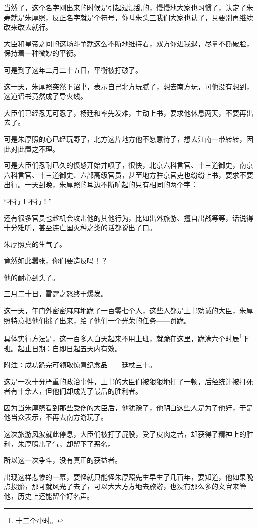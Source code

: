 \begin{multicols}{\theparacolNo}
		当然了，这个名字刚出来的时候是引起过混乱的，慢慢地大家也习惯了，认定了朱寿就是朱厚照，反正名字就是个符号，你叫朱头三我们大家也认了，只要别再继续改来改去就行。

		大臣和皇帝之间的这场斗争就这么不断地维持着，双方你进我退，尽量不撕破脸，保持着一种微妙的平衡。

		可是到了这年二月二十五日，平衡被打破了。

		这一天，朱厚照突然下诏书，表示自己北方玩腻了，想去南方玩，可他没有想到，这道诏书竟然成了导火线。

		大臣们已经忍无可忍了，杨廷和率先发难，主动上书，要求他休息两天，不要再出去了。

		可是朱厚照的心已经玩野了，北方这片地方他不愿意待了，想去江南一带转转，因此对此置之不理。

		可是大臣们忍耐已久的愤怒开始井喷了，很快，北京六科言官、十三道御史，南京六科言官、十三道御史、六部高级官员，甚至地方驻京官吏也纷纷上书，要求不要出行。一天到晚，朱厚照的耳边不断响起的只有相同的两个字：

		“不行！不行！”

		还有很多官员也趁机会攻击他的其他行为，比如出外旅游、擅自出战等等，话说得十分难听，甚至连亡国灭种之类的话都说出了口。

		朱厚照真的生气了。

		竟然如此嚣张，你们要造反吗！？

		他的耐心到头了。

		三月二十日，雷霆之怒终于爆发。

		这一天，午门外密密麻麻地跪了一百零七个人，这些人都是上书劝诫的大臣，朱厚照特意把他们挑了出来，给了他们一个光荣的任务——罚跪。

		具体实行方法是，这一百多人白天起来不用上班，就跪在这里，跪满六个时辰\footnote{十二个小时。}下班。起止日期：自即日起五天内有效。

		附注：成功跪完可领取惊喜纪念品——廷杖三十。

		这是一次十分严重的政治事件，上书的大臣们被狠狠地打了一顿，后经统计被打死者有十余人，但他们却成为了最后的胜利者。

		因为当朱厚照看到那些受伤的大臣后，他犹豫了，他明白这些人是为了他好，于是他当众表示，不再去南方游玩了。

		这次旅游风波就此停息，大臣们被打了屁股，受了皮肉之苦，却获得了精神上的胜利，朱厚照出了气，却留下了恶名。

		所以这一次争斗，没有真正的获益者。

		出现这样悲惨的一幕，要怪就只能怪朱厚照先生早生了几百年，要知道，他如果晚点投胎，那可就风光了去了，可以大大方方地去旅游，也没有那么多的文官来管他，历史上还能留个好名声。


\end{multicols}
